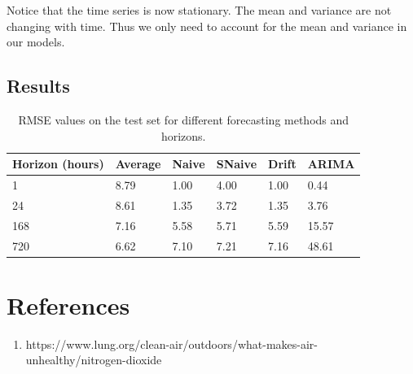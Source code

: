 \documentclass[a4paper, 10pt]{article}
\begin{document}
\begin{flushleft}
      Notice that the time series is now stationary. The mean and variance are not changing with time. Thus we only need to account for the mean and variance in our models.
   
      \subsection*{Results}
         \begin{table}[H]
            \centering
            \begin{tabularx}{\textwidth}{|l|X|X|X|X|X|}
               \hline
               Horizon (hours) & Average & Naive & SNaive & Drift & ARIMA \\
               \hline
               1    & 8.79  & 1.00  & 4.00  & 1.00  & 0.44  \\
               24   & 8.61  & 1.35  & 3.72  & 1.35  & 3.76  \\
               168  & 7.16  & 5.58  & 5.71  & 5.59  & 15.57 \\
               720  & 6.62  & 7.10  & 7.21  & 7.16  & 48.61 \\
               \hline
            \end{tabularx}
            \caption{RMSE values on the test set for different forecasting methods and horizons.}
            \label{tab:rmse_test_set}
         \end{table}

   \section*{References}
      \begin{enumerate}
         \item https://www.lung.org/clean-air/outdoors/what-makes-air-unhealthy/nitrogen-dioxide
      \end{enumerate}
   
   \end{flushleft}
\end{document}
